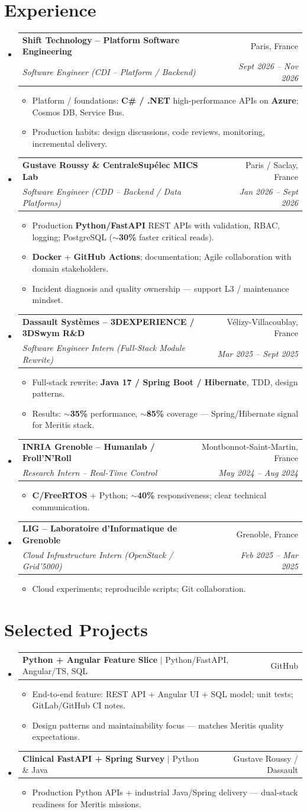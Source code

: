 \documentclass[letterpaper,10.5pt]{article}
\makeatletter
\newcommand{\resumeItem}[1]{\item\small{#1 \vspace{-1.5pt}}}
\newcommand{\resumeSubheading}[4]{\vspace{-1pt}\item\begin{tabular*}{0.97\textwidth}[t]{l@{\extracolsep{\fill}}r}\textbf{#1} & #2 \\\textit{\small#3} & \textit{\small #4} \\\end{tabular*}\vspace{-5pt}}
\newcommand{\resumeProjectHeading}[2]{\item\begin{tabular*}{0.97\textwidth}{l@{\extracolsep{\fill}}r}\small#1 & #2 \\\end{tabular*}\vspace{-5pt}}
\newcommand{\resumeSubHeadingListStart}{\begin{itemize}[leftmargin=0.15in, label={}]}
\newcommand{\resumeSubHeadingListEnd}{\end{itemize}}
\newcommand{\resumeItemListStart}{\begin{itemize}[leftmargin=0.18in]}
\newcommand{\resumeItemListEnd}{\end{itemize}\vspace{-3pt}}
\makeatother
\begin{document}
\section{Experience}
\resumeSubHeadingListStart
  \resumeSubheading
    {Shift Technology -- Platform Software Engineering}{Paris, France}
    {Software Engineer (CDI -- Platform / Backend)}{Sept 2026 -- Nov 2026}
    \resumeItemListStart
      \resumeItem{Platform / foundations: \textbf{C\# / .NET} high-performance APIs on \textbf{Azure}; Cosmos DB, Service Bus.}
      \resumeItem{Production habits: design discussions, code reviews, monitoring, incremental delivery.}
    \resumeItemListEnd
  \resumeSubheading
    {Gustave Roussy \& CentraleSup\'elec MICS Lab}{Paris / Saclay, France}
    {Software Engineer (CDD -- Backend / Data Platforms)}{Jan 2026 -- Sept 2026}
    \resumeItemListStart
      \resumeItem{Production \textbf{Python/FastAPI} REST APIs with validation, RBAC, logging; PostgreSQL (\textbf{$\sim$30\%} faster critical reads).}
      \resumeItem{\textbf{Docker} + \textbf{GitHub Actions}; documentation; Agile collaboration with domain stakeholders.}
      \resumeItem{Incident diagnosis and quality ownership --- support L3 / maintenance mindset.}
    \resumeItemListEnd
  \resumeSubheading
    {Dassault Syst\`emes -- 3DEXPERIENCE / 3DSwym R\&D}{V\'elizy-Villacoublay, France}
    {Software Engineer Intern (Full-Stack Module Rewrite)}{Mar 2025 -- Sept 2025}
    \resumeItemListStart
      \resumeItem{Full-stack rewrite: \textbf{Java 17 / Spring Boot / Hibernate}, TDD, design patterns.}
      \resumeItem{Results: \textbf{$\sim$35\%} performance, \textbf{$\sim$85\%} coverage --- Spring/Hibernate signal for Meritis stack.}
    \resumeItemListEnd
  \resumeSubheading
    {INRIA Grenoble -- Humanlab / Froll'N'Roll}{Montbonnot-Saint-Martin, France}
    {Research Intern -- Real-Time Control}{May 2024 -- Aug 2024}
    \resumeItemListStart
      \resumeItem{\textbf{C/FreeRTOS} + Python; \textbf{$\sim$40\%} responsiveness; clear technical communication.}
    \resumeItemListEnd
  \resumeSubheading
    {LIG -- Laboratoire d'Informatique de Grenoble}{Grenoble, France}
    {Cloud Infrastructure Intern (OpenStack / Grid'5000)}{Feb 2025 -- Mar 2025}
    \resumeItemListStart
      \resumeItem{Cloud experiments; reproducible scripts; Git collaboration.}
    \resumeItemListEnd
\resumeSubHeadingListEnd
\section{Selected Projects}
\resumeSubHeadingListStart
  \resumeProjectHeading{\textbf{Python + Angular Feature Slice} $|$ Python/FastAPI, Angular/TS, SQL}{GitHub}
    \resumeItemListStart
      \resumeItem{End-to-end feature: REST API + Angular UI + SQL model; unit tests; GitLab/GitHub CI notes.}
      \resumeItem{Design patterns and maintainability focus --- matches Meritis quality expectations.}
    \resumeItemListEnd
  \resumeProjectHeading{\textbf{Clinical FastAPI + Spring Survey} $|$ Python \& Java}{Gustave Roussy / Dassault}
    \resumeItemListStart
      \resumeItem{Production Python APIs + industrial Java/Spring delivery --- dual-stack readiness for Meritis missions.}
    \resumeItemListEnd
\resumeSubHeadingListEnd
\end{document}
